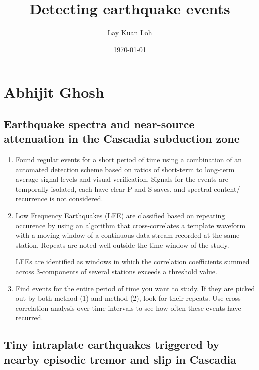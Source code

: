 \documentclass[a4paper, 11pt]{article} %
\title{Detecting earthquake events} %
\author{Lay Kuan Loh} %
\date{\today} %
\begin{document}
\maketitle %


\section{Abhijit Ghosh}

\subsection{Earthquake spectra and near-source attenuation in the Cascadia subduction zone}

\begin{enumerate}
	\item Found regular events for a short period of time using a combination of an automated detection scheme based on ratios of short-term to long-term average signal levels and visual verification. Signals for the events are temporally isolated, each have clear P and S saves, and spectral content/ recurrence is not considered.
	\item Low Frequency Earthquakes (LFE) are classified based on repeating occurence by using an algorithm that cross-correlates a template waveform with a moving window of a continuous data stream recorded at the same station. Repeats are noted well outside the time window of the study. 

	LFEs are identified as windows in which the correlation coefficients summed across 3-components of several stations exceeds a threshold value. 
	\item Find events for the entire period of time you want to study. If they are picked out by both method (1) and method (2), look for their repeats. Use cross-correlation analysis over time intervals to see how often these events have recurred. 
\end{enumerate}

\subsection{Tiny intraplate earthquakes triggered by nearby episodic tremor and slip in Cascadia}
\end{document}
